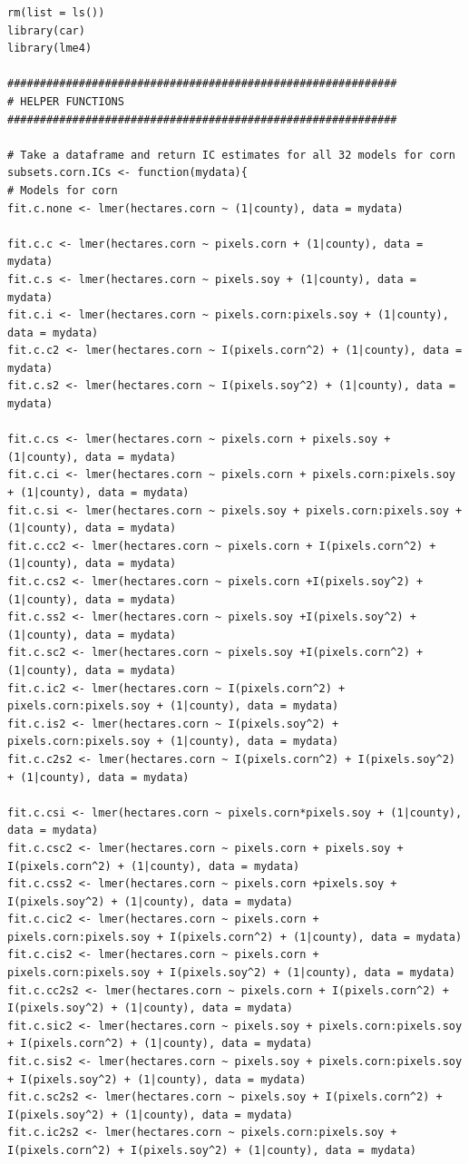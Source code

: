 \documentclass{article}
\begin{document}
\begin{Verbatim}[fontsize=\tiny]
rm(list = ls())
library(car)
library(lme4)

############################################################ 
# HELPER FUNCTIONS 
############################################################ 

# Take a dataframe and return IC estimates for all 32 models for corn
subsets.corn.ICs <- function(mydata){
# Models for corn
fit.c.none <- lmer(hectares.corn ~ (1|county), data = mydata)

fit.c.c <- lmer(hectares.corn ~ pixels.corn + (1|county), data = mydata)
fit.c.s <- lmer(hectares.corn ~ pixels.soy + (1|county), data = mydata)
fit.c.i <- lmer(hectares.corn ~ pixels.corn:pixels.soy + (1|county), data = mydata)
fit.c.c2 <- lmer(hectares.corn ~ I(pixels.corn^2) + (1|county), data = mydata)
fit.c.s2 <- lmer(hectares.corn ~ I(pixels.soy^2) + (1|county), data = mydata)

fit.c.cs <- lmer(hectares.corn ~ pixels.corn + pixels.soy + (1|county), data = mydata)
fit.c.ci <- lmer(hectares.corn ~ pixels.corn + pixels.corn:pixels.soy + (1|county), data = mydata)
fit.c.si <- lmer(hectares.corn ~ pixels.soy + pixels.corn:pixels.soy + (1|county), data = mydata)
fit.c.cc2 <- lmer(hectares.corn ~ pixels.corn + I(pixels.corn^2) + (1|county), data = mydata)
fit.c.cs2 <- lmer(hectares.corn ~ pixels.corn +I(pixels.soy^2) + (1|county), data = mydata)
fit.c.ss2 <- lmer(hectares.corn ~ pixels.soy +I(pixels.soy^2) + (1|county), data = mydata)
fit.c.sc2 <- lmer(hectares.corn ~ pixels.soy +I(pixels.corn^2) + (1|county), data = mydata)
fit.c.ic2 <- lmer(hectares.corn ~ I(pixels.corn^2) + pixels.corn:pixels.soy + (1|county), data = mydata)
fit.c.is2 <- lmer(hectares.corn ~ I(pixels.soy^2) + pixels.corn:pixels.soy + (1|county), data = mydata)
fit.c.c2s2 <- lmer(hectares.corn ~ I(pixels.corn^2) + I(pixels.soy^2) + (1|county), data = mydata)

fit.c.csi <- lmer(hectares.corn ~ pixels.corn*pixels.soy + (1|county), data = mydata)
fit.c.csc2 <- lmer(hectares.corn ~ pixels.corn + pixels.soy + I(pixels.corn^2) + (1|county), data = mydata)
fit.c.css2 <- lmer(hectares.corn ~ pixels.corn +pixels.soy + I(pixels.soy^2) + (1|county), data = mydata)
fit.c.cic2 <- lmer(hectares.corn ~ pixels.corn + pixels.corn:pixels.soy + I(pixels.corn^2) + (1|county), data = mydata)
fit.c.cis2 <- lmer(hectares.corn ~ pixels.corn + pixels.corn:pixels.soy + I(pixels.soy^2) + (1|county), data = mydata)
fit.c.cc2s2 <- lmer(hectares.corn ~ pixels.corn + I(pixels.corn^2) + I(pixels.soy^2) + (1|county), data = mydata)
fit.c.sic2 <- lmer(hectares.corn ~ pixels.soy + pixels.corn:pixels.soy + I(pixels.corn^2) + (1|county), data = mydata)
fit.c.sis2 <- lmer(hectares.corn ~ pixels.soy + pixels.corn:pixels.soy + I(pixels.soy^2) + (1|county), data = mydata)
fit.c.sc2s2 <- lmer(hectares.corn ~ pixels.soy + I(pixels.corn^2) + I(pixels.soy^2) + (1|county), data = mydata)
fit.c.ic2s2 <- lmer(hectares.corn ~ pixels.corn:pixels.soy + I(pixels.corn^2) + I(pixels.soy^2) + (1|county), data = mydata)


\end{Verbatim}
\end{document}
